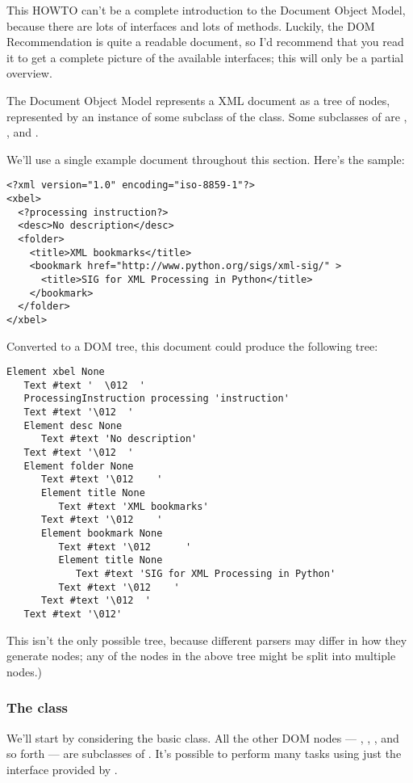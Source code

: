 \documentclass{howto}
\begin{document}
This HOWTO can't be a complete introduction to the Document Object
Model, because there are lots of interfaces and lots of
methods. Luckily, the DOM Recommendation is quite a readable document,
so I'd recommend that you read it to get a complete picture of the
available interfaces; this will only be a partial overview.

The Document Object Model represents a XML document as a tree of
nodes, represented by an instance of some subclass of the 
class.  Some subclasses of  are ,
, and .  

We'll use a single example document throughout this section.  Here's the sample:

\begin{verbatim}
<?xml version="1.0" encoding="iso-8859-1"?>
<xbel>  
  <?processing instruction?>
  <desc>No description</desc>
  <folder>
    <title>XML bookmarks</title>
    <bookmark href="http://www.python.org/sigs/xml-sig/" >
      <title>SIG for XML Processing in Python</title>
    </bookmark>
  </folder>
</xbel>
\end{verbatim}

Converted to a DOM tree, this document could produce the following tree:

\begin{verbatim}
Element xbel None
   Text #text '  \012  '
   ProcessingInstruction processing 'instruction'
   Text #text '\012  '
   Element desc None
      Text #text 'No description'
   Text #text '\012  '
   Element folder None
      Text #text '\012    '
      Element title None
         Text #text 'XML bookmarks'
      Text #text '\012    '
      Element bookmark None
         Text #text '\012      '
         Element title None
            Text #text 'SIG for XML Processing in Python'
         Text #text '\012    '
      Text #text '\012  '
   Text #text '\012'
\end{verbatim}

This isn't the only possible tree, because different parsers may
differ in how they generate  nodes; any of the
 nodes in the above tree might be split into multiple nodes.)

\subsubsection{The  class}

We'll start by considering the basic  class.  All the
other DOM nodes --- , , ,
and so forth --- are subclasses of .  It's possible to
perform many tasks using just the interface provided by .
\end{document}
